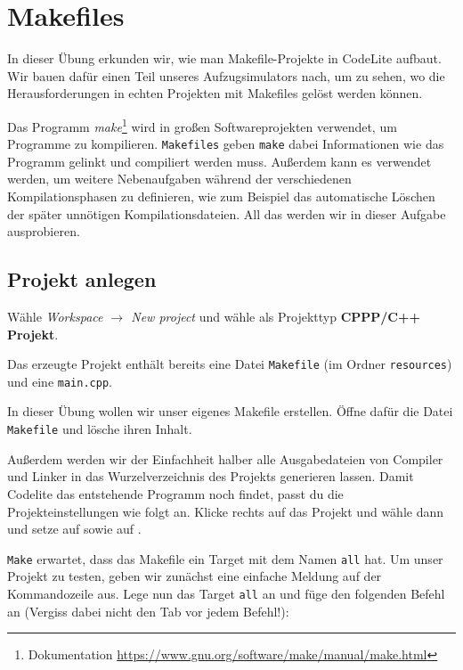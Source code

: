 \section{\ExercisePrefixAdvanced Makefiles}

In dieser Übung erkunden wir, wie man Makefile-Projekte in CodeLite aufbaut.
Wir bauen dafür einen Teil unseres Aufzugsimulators nach, um zu sehen, wo die Herausforderungen in echten Projekten mit Makefiles gelöst werden können.

Das Programm \emph{make}\footnote{Dokumentation \url{https://www.gnu.org/software/make/manual/make.html}} wird in großen Softwareprojekten verwendet, um Programme zu kompilieren.
\texttt{Makefiles} geben \texttt{make} dabei Informationen wie das Programm gelinkt und compiliert werden muss.
Außerdem kann es verwendet werden, um weitere Nebenaufgaben während der verschiedenen Kompilationsphasen zu definieren, wie zum Beispiel das automatische Löschen der später unnötigen Kompilationsdateien.
All das werden wir in dieser Aufgabe ausprobieren.

\subsection{Projekt anlegen}
Wähle \emph{Workspace $\to$ New project} und wähle als Projekttyp \textbf{CPPP/C++ Projekt}.

Das erzeugte Projekt enthält bereits eine Datei \texttt{Makefile} (im Ordner \texttt{resources}) und eine \texttt{main.cpp}.

In dieser Übung wollen wir unser eigenes Makefile erstellen. Öffne dafür die Datei \texttt{Makefile} und lösche ihren Inhalt. 

Außerdem werden wir der Einfachheit halber alle Ausgabedateien von Compiler und Linker in das Wurzelverzeichnis des Projekts generieren lassen.
Damit Codelite das entstehende Programm noch findet, passt du die Projekteinstellungen wie folgt an.
Klicke rechts auf das Projekt und wähle dann  und setze  auf  sowie  auf .

\texttt{Make} erwartet, dass das Makefile ein Target mit dem Namen \lstinline{all} hat.
Um unser Projekt zu testen, geben wir zunächst eine einfache Meldung auf der Kommandozeile aus.
Lege nun das Target \lstinline{all} an und füge den folgenden Befehl an (Vergiss dabei nicht den Tab vor jedem Befehl!):

